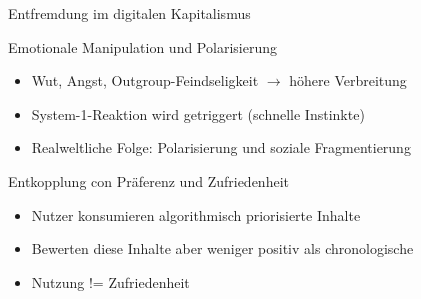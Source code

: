 
\begin{frame}{Entfremdung im digitalen Kapitalismus}
\end{frame}

\begin{frame}{Emotionale Manipulation und Polarisierung}
    \begin{itemize}
    \item Wut, Angst, Outgroup-Feindseligkeit $\rightarrow$ höhere Verbreitung
    \item System-1-Reaktion wird getriggert (schnelle Instinkte)
    \item Realweltliche Folge: Polarisierung und soziale Fragmentierung
    \end{itemize}
\end{frame}

\begin{frame}{Entkopplung con Präferenz und Zufriedenheit~\cite{milli_engagement_2024}}
    \begin{itemize}
        \item Nutzer konsumieren algorithmisch priorisierte Inhalte
        \item Bewerten diese Inhalte aber weniger positiv als chronologische
        \item Nutzung != Zufriedenheit
    \end{itemize}
\end{frame}

